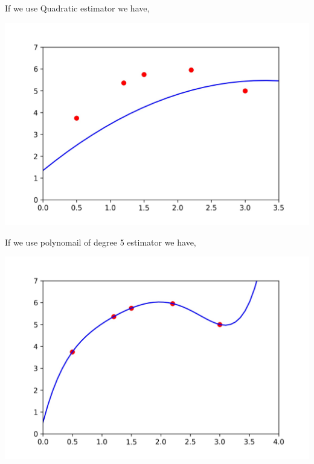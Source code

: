 \documentclass[12pt,aspectratio=169]{beamer}
\begin{document}
\begin{frame}
If we use Quadratic estimator we have,
\begin{center}
\includegraphics[scale=0.7]{Quadratic3}
\end{center}
\end{frame}


\begin{frame}
If we use polynomail of degree 5 estimator we have,
\begin{center}
\includegraphics[scale=0.7]{Quadratic4}
\end{center}
\end{frame}
\end{document}
